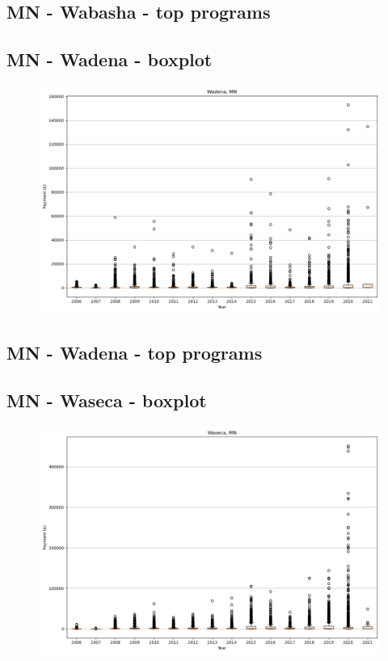 \subsection*{MN - Wabasha - top programs}

\newpage
\subsection*{MN - Wadena - boxplot}
\begin{figure}[h]
\centering
\includegraphics[width=7in]{../output/boxplots/counties/Wadena-MN_boxplot.png}
\end{figure}


\subsection*{MN - Wadena - top programs}

\newpage
\subsection*{MN - Waseca - boxplot}
\begin{figure}[h]
\centering
\includegraphics[width=7in]{../output/boxplots/counties/Waseca-MN_boxplot.png}
\end{figure}


